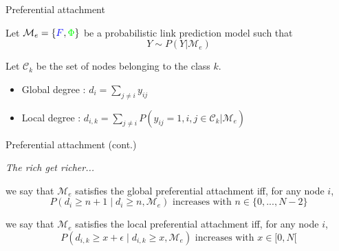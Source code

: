 \begin{frame}[c]{Preferential attachment}


    \begin{definition}[Degrees]
    Let $\mathcal{M}_e = \{ \textcolor{blue}{F}, \textcolor{green}{\Phi} \}$ be a probabilistic link prediction model such that 
    \[Y\sim P(Y|\mathcal{M}_e) \]

    Let $\mathcal{C}_k$ be the set of nodes belonging to the class $k$.

    \begin{itemize}
    \item Global degree : $d_i  = \sum_{j\neq i} y_{ij}$
    \item  Local degree :  $d_{i,k}  = \sum_{j\neq i} P(y_{ij}=1, i,j\in \mathcal{C}_k | \mathcal{M}_e) $
    \end{itemize}
    \end{definition}





\end{frame}


\begin{frame}[c]{Preferential attachment (cont.)}

\emph{The rich get richer...}
\vspace{2em}

\begin{definition}
we say that $\mathcal{M}_e$ satisfies the global preferential attachment iff, for any node $i$, 
\[P(d_i \ge n+1 \mid d_i \ge n, \mathcal{M}_e) \textrm{ increases with } n \in \{0,..., N-2\} \]
\end{definition}

\begin{definition}
we say that  $\mathcal{M}_e$ satisfies the local preferential attachment iff, for any node $i$, 
\[P(d_{i,k} \ge x+\epsilon \mid d_{i,k} \ge x, \mathcal{M}_e) \textrm{ increases with } x \in [0,N[ \]
\end{definition}

\end{frame}

